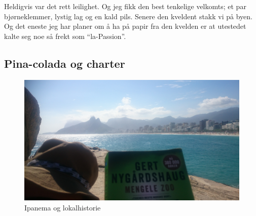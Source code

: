 Heldigvis var det rett leilighet. Og jeg fikk den best tenkelige
velkomts; et par
bjørneklemmer, lystig lag og en kald pils. Senere den kveldent stakk
vi på byen. Og det eneste jeg har planer om å ha på papir fra den
kvelden er at utestedet kalte seg noe så frekt som ``la-Passion''.
\clearpage

\subsection*{Pina-colada og charter}
\begin{figure}[h]
	\centering
	\includegraphics[width=\textwidth]{mengelezoo}
	\caption{Ipanema og lokalhistorie}
\label{fig:mengelezoo}

\end{figure}

